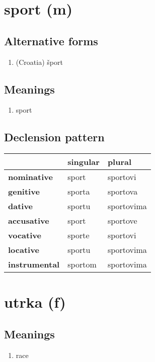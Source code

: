 \filbreak
\section{sport (m)}
\subsection*{Alternative forms}
\begin{enumerate}
\item (Croatia) šport
\end{enumerate}
\subsection*{Meanings}
\begin{enumerate}
\item sport
\end{enumerate}
\subsection*{Declension pattern}
\begin{tabularx}{\linewidth}{Xll}
\toprule
{} & singular &      plural \\
\midrule
\textbf{nominative  } &    sport &    sportovi \\
\textbf{genitive    } &   sporta &    sportova \\
\textbf{dative      } &   sportu &  sportovima \\
\textbf{accusative  } &    sport &    sportove \\
\textbf{vocative    } &   sporte &    sportovi \\
\textbf{locative    } &   sportu &  sportovima \\
\textbf{instrumental} &  sportom &  sportovima \\
\bottomrule
\end{tabularx}

\filbreak
\section{utrka (f)}
\subsection*{Meanings}
\begin{enumerate}
\item race
\end{enumerate}
